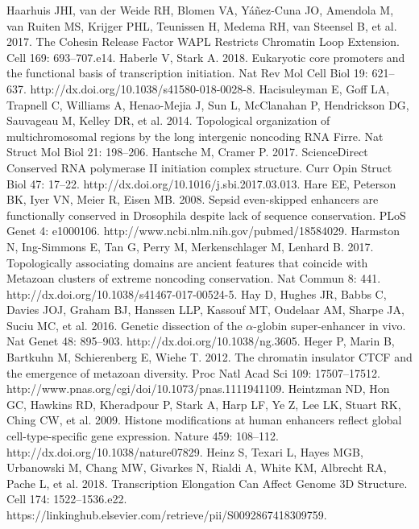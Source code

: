 \begin{thebibliography}{1}
	 Haarhuis JHI, van der Weide RH, Blomen VA, Yáñez-Cuna JO, Amendola M, van Ruiten MS, Krijger PHL, Teunissen H, Medema RH, van Steensel B, et al. 2017. The Cohesin Release Factor WAPL Restricts Chromatin Loop Extension. Cell 169: 693–707.e14.
	 Haberle V, Stark A. 2018. Eukaryotic core promoters and the functional basis of transcription initiation. Nat Rev Mol Cell Biol 19: 621–637. http://dx.doi.org/10.1038/s41580-018-0028-8.
	 Hacisuleyman E, Goff LA, Trapnell C, Williams A, Henao-Mejia J, Sun L, McClanahan P, Hendrickson DG, Sauvageau M, Kelley DR, et al. 2014. Topological organization of multichromosomal regions by the long intergenic noncoding RNA Firre. Nat Struct Mol Biol 21: 198–206.
	 Hantsche M, Cramer P. 2017. ScienceDirect Conserved RNA polymerase II initiation complex structure. Curr Opin Struct Biol 47: 17–22. http://dx.doi.org/10.1016/j.sbi.2017.03.013.
	 Hare EE, Peterson BK, Iyer VN, Meier R, Eisen MB. 2008. Sepsid even-skipped enhancers are functionally conserved in Drosophila despite lack of sequence conservation. PLoS Genet 4: e1000106. http://www.ncbi.nlm.nih.gov/pubmed/18584029.
	 Harmston N, Ing-Simmons E, Tan G, Perry M, Merkenschlager M, Lenhard B. 2017. Topologically associating domains are ancient features that coincide with Metazoan clusters of extreme noncoding conservation. Nat Commun 8: 441. http://dx.doi.org/10.1038/s41467-017-00524-5.
	 Hay D, Hughes JR, Babbs C, Davies JOJ, Graham BJ, Hanssen LLP, Kassouf MT, Oudelaar AM, Sharpe JA, Suciu MC, et al. 2016. Genetic dissection of the $\alpha$-globin super-enhancer in vivo. Nat Genet 48: 895–903. http://dx.doi.org/10.1038/ng.3605.
	 Heger P, Marin B, Bartkuhn M, Schierenberg E, Wiehe T. 2012. The chromatin insulator CTCF and the emergence of metazoan diversity. Proc Natl Acad Sci 109: 17507–17512. http://www.pnas.org/cgi/doi/10.1073/pnas.1111941109.
	 Heintzman ND, Hon GC, Hawkins RD, Kheradpour P, Stark A, Harp LF, Ye Z, Lee LK, Stuart RK, Ching CW, et al. 2009. Histone modifications at human enhancers reflect global cell-type-specific gene expression. Nature 459: 108–112. http://dx.doi.org/10.1038/nature07829.
	 Heinz S, Texari L, Hayes MGB, Urbanowski M, Chang MW, Givarkes N, Rialdi A, White KM, Albrecht RA, Pache L, et al. 2018. Transcription Elongation Can Affect Genome 3D Structure. Cell 174: 1522–1536.e22. https://linkinghub.elsevier.com/retrieve/pii/S0092867418309759.

\end{thebibliography}
